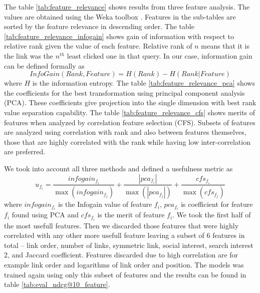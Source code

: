The table \ref{tab:feature_relevance} shows results from three feature analysis. The values are obtained using the Weka toolbox \cite{weka}. Features in the sub-tables are sorted by the feature relevance in descending order. The table \ref{tab:feature_relevance_infogain} shows gain of information with respect to relative rank given the value of each feature. Relative rank of $n$ means that it is the link was the $n^{th}$ least clicked one in that query. In our case, information gain can be defined formally as
$$ InfoGain(Rank,Feature) = H(Rank) - H(Rank | Feature) $$
where $H$ is the information entropy. The table \ref{tab:feature_relevance_pca} shows the coefficients for the best transformation using principal component analysis (PCA). These coefficients give projection into the single dimension with best rank value separation capability. The table \ref{tab:feature_relevance_cfs} shows merits of features when analyzed by correlation feature selection (CFS). Subsets of features are analyzed using correlation with rank and also between features themselves, those that are highly correlated with the rank while having low inter-correlation are preferred.


%
%
%

We took into account all three methods and defined a usefulness metric as $$u_{f_i} = \frac{infogain_{f_i}}{\max(infogain_{f_j})} + \frac{|pca_{f_i}|}{\max(|pca_{f_j}|)} + \frac{cfs_{f_i}}{\max(cfs_{f_j})}$$ where $infogain_{f_i}$ is the Infogain value of feature $f_i$, $pca_{f_i}$ is coefficient for feature $f_i$ found using PCA and $cfs_{f_i}$ is the merit of feature $f_i$. We took the first half of the most usefull features. Then we discarded those features that were highly correlated with any other more usefull feature leaving a subset of 6 features in total -- link order, number of links, symmetric link, social interest, search interest 2, and Jaccard coefficient. Features discarded due to high correlation are for example link order and logarithms of link order and position. The models was trained again using only this subset of features and the results can be found in table \ref{tab:eval_ndcg@10_feature}.

